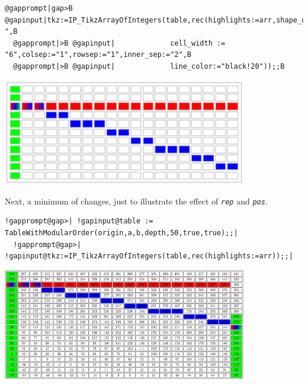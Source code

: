 \documentclass[a4paper,11pt]{report}
\begin{document}
{{\begin{Verbatim}[commandchars=@|B,fontsize=\small,frame=single,label=Example]
  @gapprompt|gap>B @gapinput|tkz:=IP_TikzArrayOfIntegers(table,rec(highlights:=arr,shape_only:=" ",B
  @gapprompt|>B @gapinput|             cell_width := "6",colsep:="1",rowsep:="1",inner_sep:="2",B
  @gapprompt|>B @gapinput|             line_color:="black!20"));;B
\end{Verbatim}
  \begin{center}
\includegraphics[width=0.80\textwidth]{../images/table_axis_ground_shape}
\end{center}   Next, a minimum of changes, just to illustrate the effect of \mbox{\texttt{\mdseries\slshape rep}} and \mbox{\texttt{\mdseries\slshape pos}}. 
\begin{Verbatim}[commandchars=!@|,fontsize=\small,frame=single,label=Example]
  !gapprompt@gap>| !gapinput@table := TableWithModularOrder(origin,a,b,depth,50,true,true);;|
  !gapprompt@gap>| !gapinput@tkz:=IP_TikzArrayOfIntegers(table,rec(highlights:=arr));;|
\end{Verbatim}
  \begin{center}
\includegraphics[width=0.80\textwidth]{../images/table_axis_ground_8_19_rep_pos}
\end{center}   }

 }

  
\end{document}

